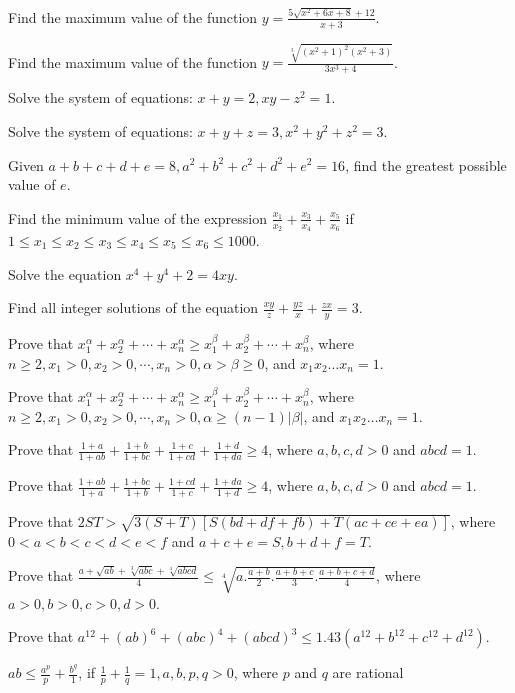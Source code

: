 \item Find the maximum value of the function $y = \frac{5\sqrt{x^2 + 6x + 8} + 12}{x + 3}$.
\item Find the maximum value of the function $y = \frac{\sqrt[3]{(x^2 + 1)^2(x^2 + 3)}}{3x^3 + 4}$.
\item Solve the system of equations: $x + y = 2, xy - z^2 = 1$.
\item Solve the system of equations: $x + y + z = 3, x^2 + y^2 + z^2 = 3$.
\item Given $a + b + c + d + e = 8, a^2 + b^2 + c^2 + d^2 + e^2 = 16$, find the greatest possible value of $e$.
\item Find the minimum value of the expression $\frac{x_1}{x_2} + \frac{x_3}{x_4} + \frac{x_5}{x_6}$ if $1\leq x_1\leq x_2\leq
  x_3\leq x_4\leq x_5\leq x_6\leq 1000$.
\item Solve the equation $x^4 + y^4 + 2 = 4xy$.
\item Find all integer solutions of the equation $\frac{xy}{z} + \frac{yz}{x} + \frac{zx}{y} = 3$.
\item Prove that $x_1^\alpha + x_2^\alpha + \cdots + x_n^\alpha\geq x_1^\beta + x_2^\beta + \cdots + x_n^\beta$, where $n\geq 2,
  x_1 > 0, x_2 > 0, \cdots, x_n > 0, \alpha > \beta \geq 0$, and $x_1x_2\ldots x_n = 1$.
\item Prove that $x_1^\alpha + x_2^\alpha + \cdots + x_n^\alpha\geq x_1^\beta + x_2^\beta + \cdots + x_n^\beta$, where $n\geq 2,
  x_1 > 0, x_2 > 0, \cdots, x_n > 0, \alpha\geq (n - 1)|\beta|$, and $x_1x_2\ldots x_n = 1$.
\item Prove that $\frac{1 + a}{1 + ab} + \frac{1 + b}{1 + bc} + \frac{1 + c}{1 + cd} + \frac{1 + d}{1 + da}\geq 4$, where $a, b, c,
  d > 0$ and $abcd = 1$.
\item Prove that $\frac{1 + ab}{1 + a} + \frac{1 + bc}{1 + b} + \frac{1 + cd}{1 + c} + \frac{1 + da}{1 + d}\geq 4$, where $a, b, c,
  d > 0$ and $abcd = 1$.
\item Prove that $2ST > \sqrt{3(S + T)[S(bd + df + fb) + T(ac + ce + ea)]}$, where $0 < a < b < c < d < e < f$ and $a + c + e = S,
  b + d + f = T$.
\item Prove that $\frac{a + \sqrt{ab} + \sqrt[3]{abc} + \sqrt[4]{abcd}}{4}\leq \sqrt[4]{a.\frac{a + b}{2}.\frac{a + b +
    c}{3}. \frac{a + b + c + d}{4}}$, where $a > 0, b > 0, c > 0, d > 0$.
\item Prove that $a^{12} + (ab)^6 + (abc)^4 + (abcd)^3\leq 1.43(a^{12} + b^{12} + c^{12} + d^{12})$.
\item $ab\leq \frac{a^p}{p} + \frac{b^q}{1}$, if $\frac{1}{p} + \frac{1}{q} =1, a, b, p, q >0$, where $p$ and $q$ are rational
